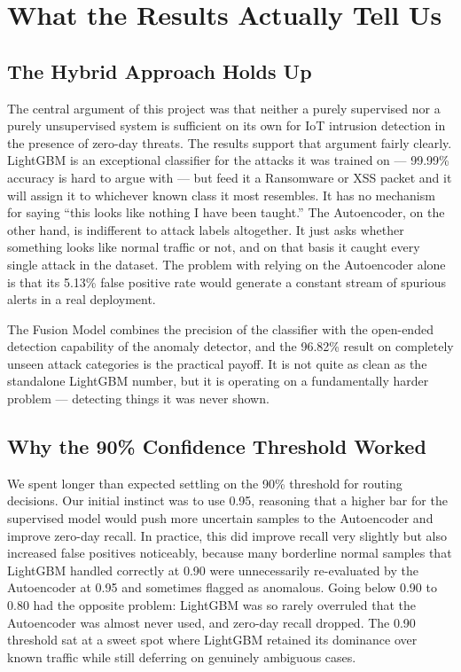 \documentclass[12pt,a4paper]{report}
\begin{document}
\section{What the Results Actually Tell Us}

\subsection{The Hybrid Approach Holds Up}

The central argument of this project was that neither a purely supervised nor a
purely unsupervised system is sufficient on its own for IoT intrusion detection
in the presence of zero-day threats. The results support that argument fairly
clearly. LightGBM is an exceptional classifier for the attacks it was trained on
--- 99.99\% accuracy is hard to argue with --- but feed it a Ransomware or XSS
packet and it will assign it to whichever known class it most resembles. It has
no mechanism for saying ``this looks like nothing I have been taught.'' The
Autoencoder, on the other hand, is indifferent to attack labels altogether. It
just asks whether something looks like normal traffic or not, and on that basis
it caught every single attack in the dataset. The problem with relying on the
Autoencoder alone is that its 5.13\% false positive rate would generate a
constant stream of spurious alerts in a real deployment.

\noindent The Fusion Model combines the precision of the classifier with the
open-ended detection capability of the anomaly detector, and the 96.82\% result
on completely unseen attack categories is the practical payoff. It is not quite
as clean as the standalone LightGBM number, but it is operating on a fundamentally
harder problem --- detecting things it was never shown.

\subsection{Why the 90\% Confidence Threshold Worked}

We spent longer than expected settling on the 90\% threshold for routing decisions.
Our initial instinct was to use 0.95, reasoning that a higher bar for the supervised
model would push more uncertain samples to the Autoencoder and improve zero-day
recall. In practice, this did improve recall very slightly but also increased false
positives noticeably, because many borderline normal samples that LightGBM handled
correctly at 0.90 were unnecessarily re-evaluated by the Autoencoder at 0.95 and
sometimes flagged as anomalous. Going below 0.90 to 0.80 had the opposite problem:
LightGBM was so rarely overruled that the Autoencoder was almost never used, and
zero-day recall dropped. The 0.90 threshold sat at a sweet spot where LightGBM
retained its dominance over known traffic while still deferring on genuinely
ambiguous cases.
\end{document}
